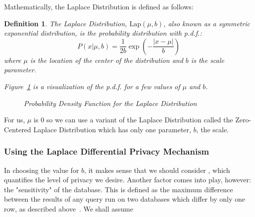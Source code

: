 \documentclass[conference,11pt]{IEEEtran}
\newtheorem{definition}{Definition}
\begin{document}
Mathematically, the Laplace Distribution is defined as follows:
\begin{mdframed}
    \begin{definition}
        The Laplace Distribution, $\text{Lap}(\mu, b)$, also known as a
        symmetric exponential distribution, is the probability distribution with
        p.d.f.:
        \begin{equation}
            P(x|\mu, b) = \frac{1}{2b}\exp\left(-\frac{|x - \mu|}{b}\right)
        \end{equation}
        where $\mu$ is the location of the center of the distribution and $b$ is
        the scale parameter.

        Figure~\ref{fig:laplace-pdf} is a visualization of the p.d.f. for a few
        values of $\mu$ and $b$.\\

        \begin{figure}[H]
            \caption{Probability Density Function for the Laplace Distribution}
            \label{fig:laplace-pdf}
        \end{figure}
    \end{definition}
\end{mdframed}

For us, $\mu$ is 0 so we can use a variant of the Laplace Distribution called
the Zero-Centered Laplace Distribution which has only one parameter, $b$, the
scale.

\subsubsection{Using the Laplace Differential Privacy Mechanism}\label{sec:using-laplace-dp}
In choosing the value for $b$, it makes sense that we should consider
\textepsilon, which quantifies the level of privacy we desire. Another factor
comes into play, however: the "sensitivity" of the database. This is defined as
the maximum difference between the results of any query run on two databases
which differ by only one row, as described above~\cite{Atockar:2014}. We shall
assume
\end{document}
